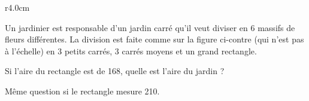
\begin{exercice}\label{exosmath-0542}

\begin{wrapfigure}{r}{4.0cm}
   \vspace{-0.5cm}        %
   \centering
   
\end{wrapfigure}

    Un jardinier est responsable d'un jardin carré qu'il veut diviser en \( 6\) massifs de fleurs différentes. La division est faite comme sur la figure ci-contre (qui n'est pas à l'échelle) en \( 3\) petits carrés, \( 3\) carrés moyens et un grand rectangle.

    Si l'aire du rectangle est de \unit{168}{\meter\squared}, quelle est l'aire du jardin ?

    Même question si le rectangle mesure \unit{210}{\meter\squared}.

\end{exercice}
